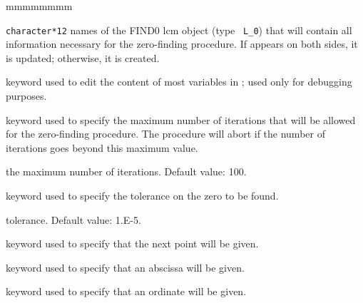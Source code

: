 \begin{ListeDeDescription}{mmmmmmmm}

\item[\dusa{L0}] {\tt character*12} names of the {\sc FIND0} {\sc lcm} object (type {\tt
L\_0}) that will contain all information necessary for the
zero-finding procedure. If  appears on both sides, it is updated;
otherwise, it is created.

%

\item[\moc{DEBUG}] keyword used to edit the content of most variables in
; used only for debugging purposes.

\item[\moc{ITMAX}] keyword used to specify the maximum number of iterations
that will be allowed for the zero-finding procedure. The procedure will
abort if the number of iterations goes beyond this maximum value.

\item[\dusa{itmax}] the maximum number of iterations. Default value: 100.

\item[\moc{TOL}] keyword used to specify the tolerance on the zero to be found.

\item[\dusa{tol}] tolerance. Default value: 1.E-5.

\item[\moc{POINT}] keyword used to specify that the next point will be given.

\item[\moc{X}] keyword used to specify that an abscissa will be given.

\item[\moc{Y}] keyword used to specify that an ordinate will be given.


\end{ListeDeDescription}

